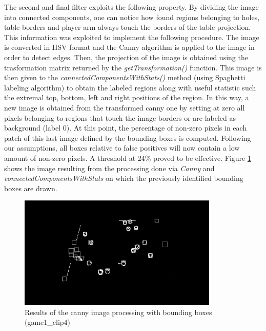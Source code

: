 The second and final filter exploits the following property. By dividing the image into connected components, one can notice how found regions belonging to holes, table borders and player arm always
touch the borders of the table projection. This information was exploited to implement the following procedure.
The image is converted in HSV format and the Canny algorithm is applied to the image in order to detect edges.
Then, the projection of the image is obtained using the trasformation matrix returned by the \textit{getTransformation()} function.
This image is then given to the \textit{connectedComponentsWithStats()} method (using Spaghetti labeling algorithm) to obtain
the labeled regions along with useful statistic such the extremal top, bottom, left and right positions of the region.
In this way, a new image is obtained from the transformed canny one by setting at zero all pixels belonging to regions that touch the image
borders or are labeled as background (label 0).
At this point, the percentage of non-zero pixels in each patch of this last image defined by the bounding boxes is computed.
Following our assumptions, all boxes relative to false positives will now contain a low amount of non-zero pixels.
A threshold at 24\% proved to be effective. Figure \ref{fig:cannyprocess} shows the image resulting from the processing done via \textit{Canny} and \textit{connectedComponentsWithStats}
on which the previously identified bounding boxes are drawn. \\
\begin{figure}[h]
    \centering
    \includegraphics[width=0.85\textwidth]{imgs/ball_localization/conn_comp1.jpg}
    \caption{Results of the canny image processing with bounding boxes (game1\_clip4)}
    \label{fig:cannyprocess}
\end{figure}

